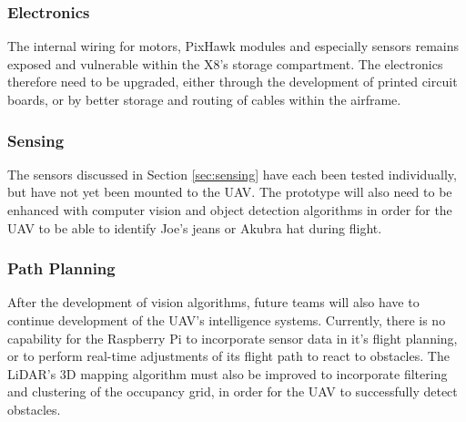 \subsubsection*{Electronics}
The internal wiring for motors, PixHawk modules and especially sensors remains exposed and vulnerable within the X8's storage compartment. The electronics therefore need to be upgraded, either through the development of printed circuit boards, or by better storage and routing of cables within the airframe.

\subsubsection*{Sensing}
The sensors discussed in Section \ref{sec:sensing} have each been tested individually, but have not yet been mounted to the UAV. The prototype will also need to be enhanced with computer vision and object detection algorithms in order for the UAV to be able to identify Joe's jeans or Akubra hat during flight.

\subsubsection*{Path Planning}
After the development of vision algorithms, future teams will also have to continue development of the UAV's intelligence systems. Currently, there is no capability for the Raspberry Pi to incorporate sensor data in it's flight planning, or to perform real-time adjustments of its flight path to react to obstacles. The LiDAR's 3D mapping algorithm must also be improved to incorporate filtering and clustering of the occupancy grid, in order for the UAV to successfully detect obstacles.